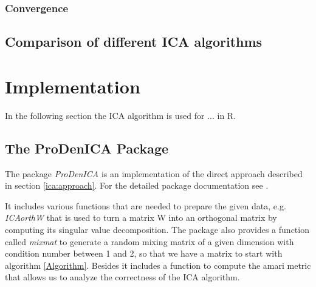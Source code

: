 \documentclass[12pt, a4paper]{article}
\numberwithin{equation}{section}
\numberwithin{figure}{section}
\numberwithin{table}{section}
\begin{document}
	\subsubsection{Convergence} \label{ica:convergence}%
	
	\subsection{Comparison of different ICA algorithms}
	\newpage
	
	\section{Implementation} 
	In the following section the ICA algorithm is used for ... %
	in R.
	\subsection{The ProDenICA Package}
	The package \textit{ProDenICA} is an implementation of the
	direct approach described in section \ref{ica:approach}.
	For the detailed package documentation see \citet{prodenica-doku}.
	
	It includes various functions that are needed to prepare the given data,
	e.g. \textit{ICAorthW} that is used to turn a matrix W into an orthogonal matrix by computing its singular value decomposition. %
	The package also provides a function called \textit{mixmat} to generate
	a random mixing matrix of a given dimension with condition number %
	between 1 and 2, so that we have a matrix to start with algorithm \ref{Algorithm}.
	Besides it includes a function to compute the amari metric that allows us to analyze the correctness of the ICA algorithm.
	
\end{document}
